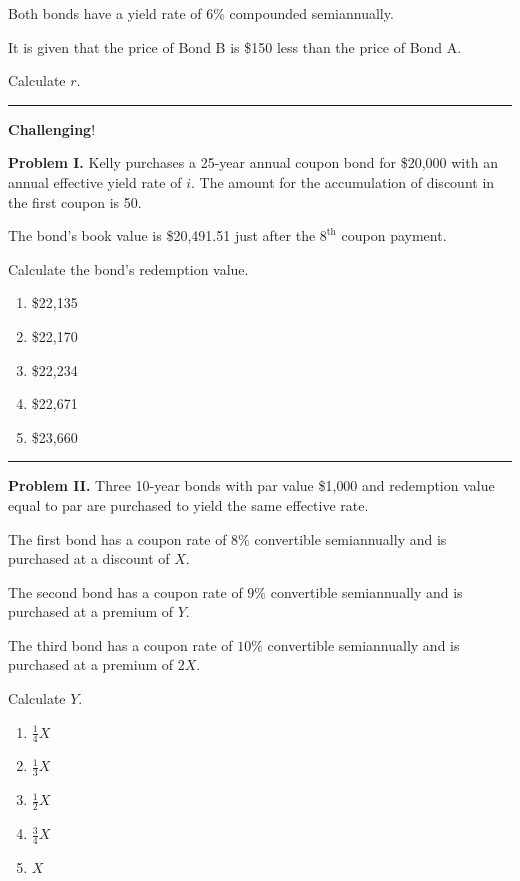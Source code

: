 \documentclass[11pt]{article}
\begin{document}
Both bonds have a yield rate of \(6\%\) compounded semiannually.

It is given that the price of Bond B is \$150 less than the price of Bond A.

Calculate \(r\).

\medskip
\hrule


\begin{center}
\begin{large}
\textbf{Challenging}!
\end{large}
\end{center}


\textbf{Problem I.} Kelly purchases a 25-year annual coupon bond for \$20{,}000 with an annual effective yield rate of \(i\). The amount for the accumulation of discount in the first coupon is 50.

The bond's book value is \$20{,}491.51 just after the \(8^\text{th}\) coupon payment.

Calculate the bond's redemption value.

\medskip
\medskip

\begin{enumerate}[label=\Alph*.]
    \item \$22{,}135
    \item \$22{,}170
    \item \$22{,}234
    \item \$22{,}671
    \item \$23{,}660
\end{enumerate}

\medskip
\hrule


\textbf{Problem II.} Three 10-year bonds with par value \$1{,}000 and redemption value equal to par are purchased to yield the same effective rate.

The first bond has a coupon rate of \(8\%\) convertible semiannually and is purchased at a discount of \(X\).

The second bond has a coupon rate of \(9\%\) convertible semiannually and is purchased at a premium of \(Y\).

The third bond has a coupon rate of \(10\%\) convertible semiannually and is purchased at a premium of \(2X\).

Calculate \(Y\).

\begin{enumerate}[label=\Alph*.]
    \item \(\frac{1}{4}X\)
    \item \(\frac{1}{3}X\)
    \item \(\frac{1}{2}X\)
    \item \(\frac{3}{4}X\)
    \item \(X\)
\end{enumerate}
\end{document}

